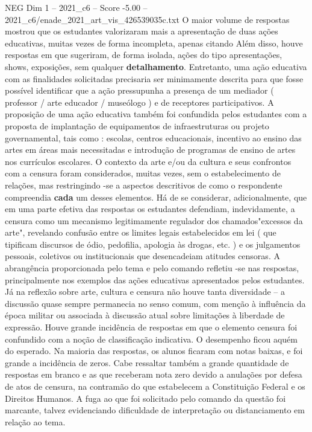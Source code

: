 \begin{textsample}{NEG Dim 1 – 2021\_c6 – Score -5.00 – 2021\_c6/enade\_2021\_art\_vis\_426539035c.txt}
O maior volume de respostas mostrou que os estudantes valorizaram mais a apresentação de duas ações educativas, muitas vezes de forma incompleta, apenas citando Além disso, houve respostas em que sugeriram, de forma isolada, ações do tipo apresentações, shows, exposições, sem qualquer \textbf{detalhamento}.
Entretanto, uma ação educativa com as finalidades solicitadas precisaria ser minimamente descrita para que fosse possível identificar que a ação pressupunha a presença de um mediador ( professor / arte educador / museólogo ) e de receptores participativos.
A proposição de uma ação educativa também foi confundida pelos estudantes com a proposta de implantação de equipamentos de infraestruturas ou projeto governamental, tais como : escolas, centros educacionais, incentivo ao ensino das artes em áreas mais necessitadas e introdução de programas de ensino de artes nos currículos escolares.
O contexto da arte e/ou da cultura e seus confrontos com a censura foram considerados, muitas vezes, sem o estabelecimento de relações, mas restringindo -se a aspectos descritivos de como o respondente compreendia \textbf{cada} um desses elementos.
Há de se considerar, adicionalmente, que em uma parte efetiva das respostas os estudantes defendiam, indevidamente, a censura como um mecanismo legitimamente regulador dos chamados"excessos da arte", revelando confusão entre os limites legais estabelecidos em lei ( que tipificam discursos de ódio, pedofilia, apologia às drogas, etc. ) e os julgamentos pessoais, coletivos ou institucionais que desencadeiam atitudes censoras.
A abrangência proporcionada pelo tema e pelo comando refletiu -se nas respostas, principalmente nos exemplos das ações educativas apresentados pelos estudantes.
Já na reflexão sobre arte, cultura e censura não houve tanta diversidade – a discussão quase sempre permanecia no senso comum, com menção à influência da época militar ou associada à discussão atual sobre limitações à liberdade de expressão.
Houve grande incidência de respostas em que o elemento censura foi confundido com a noção de classificação indicativa.
O desempenho ficou aquém do esperado.
Na maioria das respostas, os alunos ficaram com notas baixas, e foi grande a incidência de zeros.
Cabe ressaltar também a grande quantidade de respostas em branco e as que receberam nota zero devido a anulações por defesa de atos de censura, na contramão do que estabelecem a Constituição Federal e os Direitos Humanos.
A fuga ao que foi solicitado pelo comando da questão foi marcante, talvez evidenciando dificuldade de interpretação ou distanciamento em relação ao tema.

\end{textsample}
